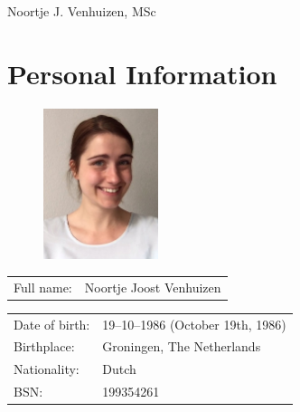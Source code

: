 \documentclass[a4paper,10pt]{article}
\def\leftcolwidth{.15\textwidth}
\def\tablevspace{10pt}
\begin{document}

\begin{flushright}
{\Huge Noortje J. Venhuizen, MSc}
\end{flushright}


\section*{Personal Information}

\begin{figure}
  \begin{flushright}
  \includegraphics[width=0.3\textwidth]{noortje.jpg}
  \end{flushright}
\end{figure}

\noindent
\begin{tabularx}{\textwidth}{ p{\leftcolwidth} X }
  Full name:      &         Noortje Joost Venhuizen\\
\end{tabularx}

\vspace{\tablevspace}

\noindent
\begin{tabularx}{\textwidth}{ p{\leftcolwidth} X }
  Date of birth:  &         19--10--1986 (October 19th, 1986)\\
  Birthplace:     &         Groningen, The Netherlands\\
  Nationality:    &         Dutch\\
  BSN:            &         199354261\\
\end{tabularx}
\end{document}
